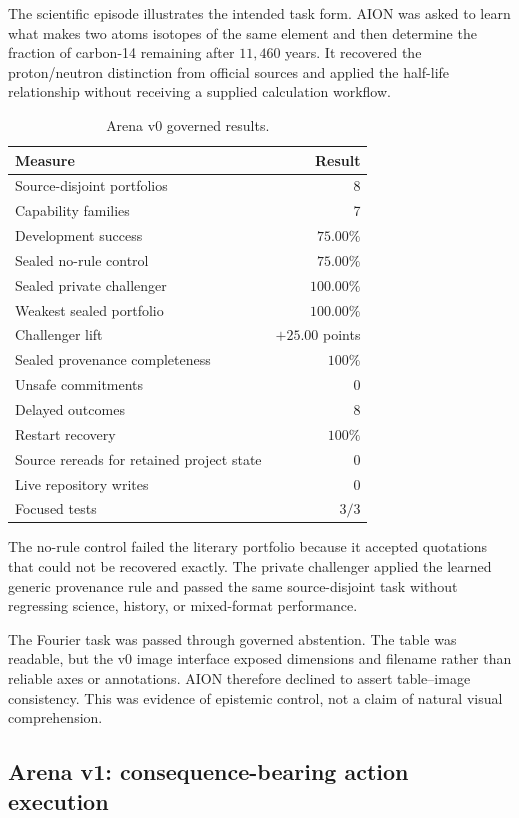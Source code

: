 The scientific episode illustrates the intended task form.  AION was asked to
learn what makes two atoms isotopes of the same element and then determine the
fraction of carbon-14 remaining after $11{,}460$ years.  It recovered the
proton/neutron distinction from official sources and applied the half-life
relationship without receiving a supplied calculation workflow.

\begin{table}[htbp]
\centering
\caption{Arena v0 governed results.}
\label{tab:arena-v0-results}
\begin{tabular}{lr}
\hline
Measure & Result \\
\hline
Source-disjoint portfolios & 8 \\
Capability families & 7 \\
Development success & $75.00\%$ \\
Sealed no-rule control & $75.00\%$ \\
Sealed private challenger & $100.00\%$ \\
Weakest sealed portfolio & $100.00\%$ \\
Challenger lift & $+25.00$ points \\
Sealed provenance completeness & $100\%$ \\
Unsafe commitments & 0 \\
Delayed outcomes & 8 \\
Restart recovery & $100\%$ \\
Source rereads for retained project state & 0 \\
Live repository writes & 0 \\
Focused tests & $3/3$ \\
\hline
\end{tabular}
\end{table}

The no-rule control failed the literary portfolio because it accepted
quotations that could not be recovered exactly.  The private challenger applied
the learned generic provenance rule and passed the same source-disjoint task
without regressing science, history, or mixed-format performance.

The Fourier task was passed through governed abstention.  The table was
readable, but the v0 image interface exposed dimensions and filename rather
than reliable axes or annotations.  AION therefore declined to assert
table--image consistency.  This was evidence of epistemic control, not a claim
of natural visual comprehension.


\subsection{Arena v1: consequence-bearing action execution}
\label{subsec:arena-v1-execution}

